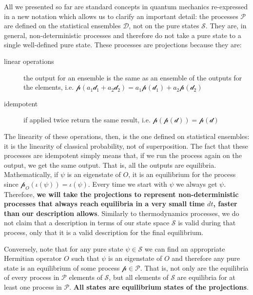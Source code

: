 \documentclass[11pt]{article}
\begin{document}
All we presented so far are standard concepts in quantum mechanics re-expressed in a new notation which allows us to clarify an important detail: the processes $\mathcal{P}$ are defined on the statistical ensembles $\mathcal{D}$, not on the pure states $\mathcal{S}$. They are, in general, non-deterministic processes and therefore do not take a pure state to a single well-defined pure state. These processes are projections because they are:
\begin{description}
	\item [linear operations] the output for an ensemble is the same as an ensemble of the outputs for the elements, i.e. $\mathcal{p}(a_1\mathcal{d}_1 + a_2\mathcal{d}_2) = a_1\mathcal{p}(\mathcal{d}_1) + a_2\mathcal{p}(\mathcal{d}_2)$
	\item [idempotent] if applied twice return the same result, i.e. $\mathcal{p}(\mathcal{p}(\mathcal{d})) = \mathcal{p}(\mathcal{d})$
\end{description}
The linearity of these operations, then, is the one defined on statistical ensembles: it is the linearity of classical probability, not of superposition. The fact that these processes are idempotent simply means that, if we run the process again on the output, we get the same output. That is, all the outputs are equilibria. Mathematically, if $\psi$ is an eigenstate of $O$, it is an equilibrium for the process since $\mathcal{p}_O(\iota(\psi))=\iota(\psi)$. Every time we start with $\psi$ we always get $\psi$. Therefore, \textbf{we will take the projections to represent non-deterministic processes that always reach equilibria in a very small time $dt$, faster than our description allows}. Similarly to thermodynamics processes, we do not claim that a description in terms of our state space $\mathcal{S}$ is valid during that process, only that it is a valid description for the final equilibrium. 

Conversely, note that for any pure state $\psi \in \mathcal{S}$ we can find an appropriate Hermitian operator $O$ such that $\psi$ is an eigenstate of $O$ and therefore any pure state is an equilibrium of some process $\mathcal{p} \in \mathcal{P}$. That is, not only are the equilibria of every process in $\mathcal{P}$ elements of $\mathcal{S}$, but all elements of $\mathcal{S}$ are equilibria for at least one process in $\mathcal{P}$. \textbf{All states are equilibrium states of the projections}.
\end{document}
